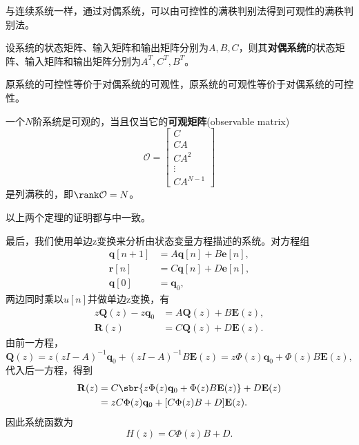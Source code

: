 与连续系统一样，通过对偶系统，可以由可控性的满秩判别法得到可观性的满秩判别法。
\begin{definition}[对偶系统]
    设系统的状态矩阵、输入矩阵和输出矩阵分别为$A,B,C$，则其\textbf{对偶系统}的状态矩阵、输入矩阵和输出矩阵分别为$A^T,C^T,B^T$。
\end{definition}

\begin{theorem}
    原系统的可控性等价于对偶系统的可观性，原系统的可观性等价于对偶系统的可控性。
\end{theorem}

\begin{theorem}[可观性的满秩判别法]
    一个$N$阶系统是可观的，当且仅当它的\textbf{可观矩阵}(observable matrix)
    \begin{equation}
        \mathcal{O}=\begin{bmatrix}
            C      \\
            CA     \\
            CA^2   \\
            \vdots \\
            CA^{N-1}
        \end{bmatrix}
    \end{equation}
    是列满秩的，即$\rank\mathcal{O}=N$。
\end{theorem}

以上两个定理的证明都与中一致。

最后，我们使用单边z变换来分析由状态变量方程描述的系统。对方程组
\begin{equation}
    \begin{aligned}
        \mathbf{q}[n+1]&=A\mathbf{q}[n]+B\mathbf{e}[n], \\
        \mathbf{r}[n]&=C\mathbf{q}[n]+D\mathbf{e}[n], \\
        \mathbf{q}[0]&=\mathbf{q}_0,
    \end{aligned}
\end{equation}
两边同时乘以$u[n]$并做单边z变换，有
\begin{equation}
    \begin{aligned}
        z\mathbf{Q}(z)-z\mathbf{q}_0&=A\mathbf{Q}(z)+B\mathbf{E}(z), \\
        \mathbf{R}(z)&=C\mathbf{Q}(z)+D\mathbf{E}(z).
    \end{aligned}
\end{equation}
由前一方程，
\begin{equation}
    \mathbf{Q}(z)=z(zI-A)^{-1}\mathbf{q}_0+(zI-A)^{-1}B\mathbf{E}(z)=z\Phi(z)\mathbf{q}_0+\Phi(z)B\mathbf{E}(z),
\end{equation}
代入后一方程，得到
\begin{align}
    \mathbf{R}(z)&=C\sbr{z\Phi(z)\mathbf{q}_0+\Phi(z)B\mathbf{E}(z)}+D\mathbf{E}(z) \nonumber \\
    &=zC\Phi(z)\mathbf{q}_0+[C\Phi(z)B+D]\mathbf{E}(z).
\end{align}
因此系统函数为
\begin{equation}
    H(z)=C\Phi(z)B+D.
\end{equation}

